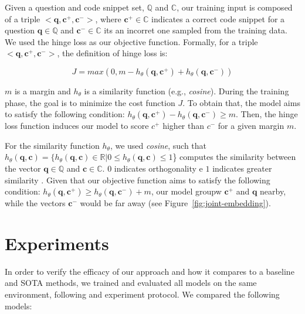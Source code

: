\documentclass[sigconf]{acmart}
\begin{document}
Given a question and code snippet set, $\mathbb{Q}$ and $\mathbb{C}$, our training input is composed of a triple $<\bm{q}, \bm{c^{+}}, \bm{c^{-}}>$, where $\bm{c^{+}} \in \mathbb{C}$ indicates a correct code snippet for a question $\bm{q} \in \mathbb{Q}$ and $\bm{c^{-}} \in \mathbb{C}$ its an incorret one sampled from the training data. We used the hinge loss as our objective function. Formally, for a triple $<\bm{q}, \bm{c^{+}}, \bm{c^{-}}>$, the definition of hinge loss is:

\begin{equation}
J = max(0, m - h_{\theta}(\bm{q}, \bm{c^{+}}) + h_{\theta}(\bm{q}, \bm{c^{-}}))
\end{equation}

$m$ is a margin and $h_{\theta}$ is a similarity function (e.g., \textit{cosine}). During the training phase, the goal is to minimize the cost function $J$. To obtain that, the model aims to satisfy the following condition: $h_{\theta}(\bm{q}, \bm{c^{+}}) - h_{\theta}(\bm{q}, \bm{c^{-}}) \geq m$. Then, the hinge loss function induces our model to score $c^{+}$ higher than $c^{-}$ for a given margin $m$. 

For the similarity function $h_{\theta}$, we used \emph{cosine}, such that $h_{\theta}(\bm{q}, \bm{c}) = \{h_{\theta}(\bm{q}, \bm{c}) \in \mathbb{R} | 0 \leq h_{\theta}(\bm{q}, \bm{c}) \leq 1$\} computes the similarity between the vector $\bm{q} \in \mathbb{Q}$ and $\bm{c} \in \mathbb{C}$. $0$ indicates orthogonality e $1$ indicates greater similarity \cite{keras-cosine-similarity-2019}. Given that our objective function aims to satisfy the following condition: $h_{\theta}(\bm{q}, \bm{c^{+}}) \geq h_{\theta}(\bm{q}, \bm{c^{-}}) + m$, our model groupw $\bm{c^{+}}$ and $\bm{q}$ nearby, while the vectors $\bm{c^{-}}$ would be far away (see Figure~\ref{fig:joint-embedding}). 

\section{Experiments}

In order to verify the efficacy of our approach and how it compares to a baseline and SOTA methods, we trained and evaluated all models on the same environment, following \citet{yao-2018} and \citet{ iyer-etal-2016-summarizing} experiment protocol. We compared the following models:
\end{document}
